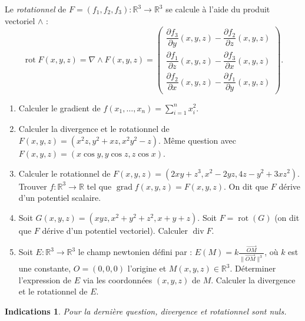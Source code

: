 \documentclass[11pt,a4paper]{article}
\newcommand{\Rr}{\mathbb{R}} \newcommand{\R}{\mathbb{R}}
\theoremstyle{exostyle}
\newtheorem{ind}{Indications}
\newcommand{\indication}{\begin{ind}} \newcommand{\finindication}{\end{ind}}
\newcommand{\grad}{\operatorname{grad}} %
\newcommand{\diver}{\operatorname{div}}
\newcommand{\rot}{\operatorname{rot}}
\begin{document}
Le \emph{rotationnel} de $F = (f_1, f_2, f_3) : \Rr^3 \to \Rr^3$  se calcule à l'aide du produit vectoriel \og{}$\wedge$\fg{} :
$$\rot F (x,y,z) =  \nabla \wedge F(x,y,z) = \begin{pmatrix}
	\dfrac{\partial f_3}{\partial y}(x,y,z)-\dfrac{\partial f_2}{\partial z}(x,y,z) \\[2ex]
	\dfrac{\partial f_1}{\partial z}(x,y,z)-\dfrac{\partial f_3}{\partial x}(x,y,z) \\[2ex]
	\dfrac{\partial f_2}{\partial x}(x,y,z)-\dfrac{\partial f_1}{\partial y}(x,y,z)
\end{pmatrix}.
$$


\begin{enumerate}
	\item Calculer le gradient de $f(x_1,\ldots,x_n) = \sum_{i=1}^n x_i^2$.
	
	\item Calculer la divergence et le rotationnel de 
	$F(x,y,z) = (x^2z, y^2+xz, x^2y^2-z)$. 
	Même question avec $F(x,y,z) = (x\cos y, y\cos z, z\cos x)$.
		
	\item Calculer le rotationnel de $F(x,y,z) = (2xy+z^3, x^2-2yz, 4z-y^2+3xz^2)$.
	Trouver $f : \Rr^3 \to \Rr$ tel que $\grad f(x,y,z) = F(x,y,z)$.
	On dit que $F$ dérive d'un potentiel scalaire.
	
	\item Soit $G(x,y,z) = (xyz, x^2+y^2+z^2, x+y+z)$. Soit $F = \rot(G)$ (on dit que $F$ dérive d'un potentiel vectoriel).
	Calculer $\diver F$. 
	
	\item Soit $E : \Rr^3 \to \Rr^3$ le champ newtonien défini par :
	$E(M) = k \frac{\overrightarrow{OM}}{\| \overrightarrow{OM} \|^3}$,
	où $k$ est une constante, $O=(0,0,0)$ l'origine et $M(x,y,z) \in \Rr^3$.
	Déterminer l'expression de $E$ via les coordonnées $(x,y,z)$ de $M$. Calculer la divergence et le rotationnel de $E$.
	
	
\end{enumerate}
\finenonce

\indication
Pour la dernière question, divergence et rotationnel sont nuls.
\finindication
\end{document}
